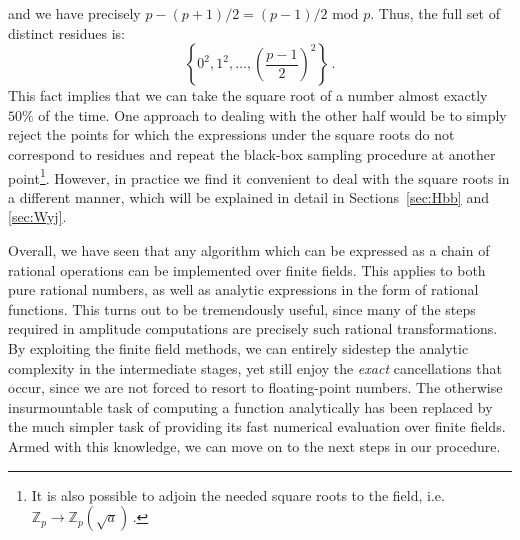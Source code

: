\documentclass[main.tex]{subfiles}
\begin{document}
and we have precisely $p - (p+1)/2 = (p-1)/2 \text{ mod }p$. Thus, the full set of distinct residues is:
\begin{equation}
    \left\{0^2, 1^2, \ldots, \left(\frac{p-1}{2}\right)^2  \right\}\,.
\end{equation}
This fact implies that we can take the square root of a number almost exactly $50\%$ of the time. One approach to dealing with the other half would be to simply reject the points for which the expressions under the square roots
do not correspond to residues and repeat the black-box sampling procedure at another point\footnote{It is also possible to adjoin the needed square roots to the field, i.e. $\mathbb{Z}_p \rightarrow \mathbb{Z}_p \left( \sqrt{a} \right)$\,.}. However, in practice we find it convenient to deal with the square roots in a different manner, which will be explained in detail in Sections~\ref{sec:Hbb} and \ref{sec:Wyj}.

Overall, we have seen that any algorithm which can be expressed as a chain of rational operations can be implemented over finite fields. This applies to both pure rational numbers, as well as analytic expressions in the form of rational functions. This turns out to be tremendously useful, since many of the steps required in amplitude computations are precisely such rational transformations. By exploiting the finite field methods, we can entirely sidestep the analytic complexity in the intermediate stages, yet still enjoy the \textit{exact} cancellations that occur, since we are not forced to resort to floating-point numbers. The otherwise insurmountable task of computing a function analytically has been replaced by the much simpler task of providing its fast numerical evaluation over finite fields. Armed with this knowledge, we can move on to the next steps in our procedure.
\end{document}
